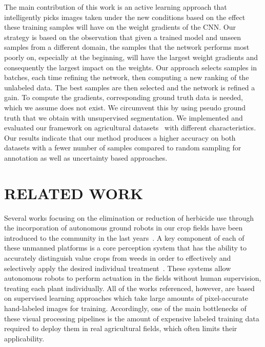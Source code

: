 \documentclass[letterpaper, 10 pt, conference]{ieeeconf}  %
\begin{document}
The main contribution of this work is an active learning approach that
intelligently picks images taken under the new conditions based on the effect
these training samples will have on the weight gradients of the CNN. Our
strategy is based  on the observation that given a trained model and unseen
samples from  a different domain, the samples that the network performs most
poorly on, especially at the  beginning, will have the largest weight
gradients and consequently the largest impact on the  weights.   Our approach
selects samples in batches, each time refining the network, then computing a
new  ranking of the unlabeled data. The best samples are then selected and the
network is refined a gain. To compute the gradients, corresponding ground
truth data is needed, which we assume does  not exist. We circumvent this by
using pseudo ground truth that we obtain with unsupervised  segmentation.  We
implemented and evaluated our framework on  agricultural datasets~\cite{chebrolu2017agricultural} 
with different characteristics.  Our results indicate that our method produces a
higher accuracy on both datasets with a fewer  number of samples compared to
random sampling for annotation as well as uncertainty based approaches.


\section{RELATED WORK}
\label{sec:related}

Several works focusing on the elimination or reduction of herbicide use
through the incorporation of autonomous ground robots in our crop fields have
been introduced to the community in the last years~\cite{ducket2018arxiv, liebisch2016wslw, mccool2018ral}.
A key component of each of these unmanned platforms is a core perception system that
has the ability to accurately distinguish value crops from weeds in order to effectively
and selectively apply the desired individual treatment~\cite{ lottes2018iros, mccool2017ral,milioto2017uavg,milioto2018real, sa2018rs}.
These systems allow autonomous robots to perform actuation in the fields without human supervision, treating each plant individually.
All of the works referenced, however, are based on supervised learning approaches which take large amounts of pixel-accurate hand-labeled images for training. 
Accordingly, one of the main bottlenecks of these visual processing pipelines is the amount of expensive labeled training data required to deploy them in real agricultural fields, which often limits their applicability.
\end{document}

